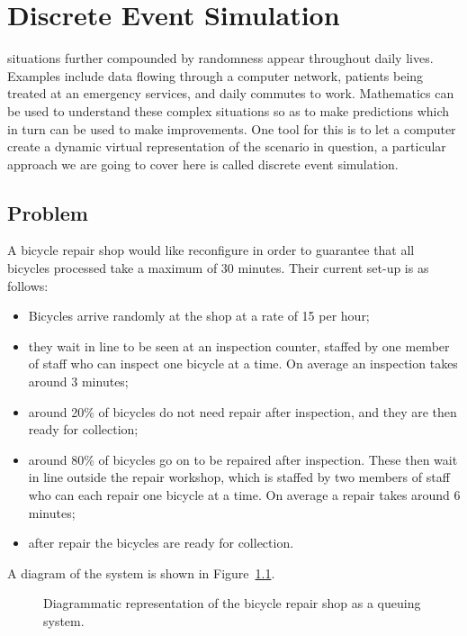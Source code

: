 \chapter[Discrete Event Simulation]{Discrete Event Simulation}\label{chp:discrete_event_simulation}

 situations further compounded by randomness appear
throughout daily lives. Examples include data flowing through a computer
network, patients being treated at an emergency services, and daily commutes to
work.
Mathematics can be used to understand these complex situations so as to
make predictions which in turn can be used to make improvements. One tool for
this is to let a computer create a dynamic virtual representation of the
scenario in question, a particular approach we are going to cover here is called
discrete event simulation.

\section{Problem}\label{sec:discrete_event_simulation_problem}

A bicycle repair shop would like reconfigure
in order to guarantee that all bicycles processed take a maximum of 30 minutes.
Their current set-up is as follows:

\begin{itemize}
  \item Bicycles arrive randomly at the shop at a rate of 15 per hour;
  \item they wait in line to be seen at an inspection counter, staffed by one
  member of staff who can inspect one bicycle at a time. On average an
  inspection takes around 3 minutes;
  \item around 20\% of bicycles do not need
  repair after inspection, and they are then ready for collection;
  \item around 80\% of bicycles go on to be
  repaired after inspection. These then wait in line outside the repair
  workshop, which is staffed by two members of staff who can each repair
  one bicycle at a time. On average
  a repair takes around 6 minutes;
  \item after repair the bicycles are ready for collection.
\end{itemize}

A diagram of the system is shown in Figure~\ref{fig:bike-shop}.

\begin{figure}
    \begin{center}
        
    \end{center}
    \caption{
        Diagrammatic representation of the bicycle repair shop as a queuing
        system.
    }
    \label{fig:bike-shop}
\end{figure}

